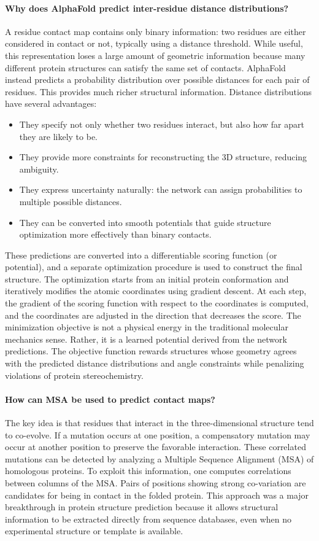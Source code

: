 \paragraph{Why does AlphaFold predict inter-residue distance distributions?}
A residue contact map contains only binary information: two residues are either considered in contact or not, typically using
a distance threshold. While useful, this representation loses a large amount of geometric information because many different protein structures can satisfy the same set of contacts.
AlphaFold instead predicts a probability distribution over possible distances for each pair of residues. This provides much richer structural information. Distance distributions have several advantages:
\begin{itemize}
    \item They specify not only whether two residues interact, but also how far apart they are likely to be.
    \item They provide more constraints for reconstructing the 3D structure, reducing ambiguity.
    \item They express uncertainty naturally: the network can assign probabilities to multiple possible distances.
    \item They can be converted into smooth potentials that guide structure optimization more effectively than binary contacts.
\end{itemize}
These predictions are converted into a differentiable scoring function (or potential), and a separate optimization procedure is used to construct the final structure.
The optimization starts from an initial protein conformation and iteratively modifies the atomic coordinates using gradient descent. At each step, the gradient of the scoring function with respect to the coordinates is computed, and the coordinates are adjusted in the direction that decreases the score.
The minimization objective is not a physical energy in the traditional molecular mechanics sense. Rather, it is a learned potential derived from the network predictions. The objective function rewards structures whose geometry agrees with the predicted distance distributions and angle constraints while penalizing violations of protein stereochemistry.


\paragraph{How can MSA be used to predict contact maps?}
The key idea is that residues that interact in the three-dimensional structure tend to co-evolve. If a mutation occurs at one position, a compensatory mutation may occur at another position to preserve the favorable interaction. These correlated mutations can be detected by analyzing a Multiple Sequence Alignment (MSA) of homologous proteins.
To exploit this information, one computes correlations between columns of the MSA. Pairs of positions showing strong co-variation are candidates for being in contact in the folded protein. 
This approach was a major breakthrough in protein structure prediction because it allows structural information to be extracted directly from sequence databases, even when no experimental structure or template is available.

